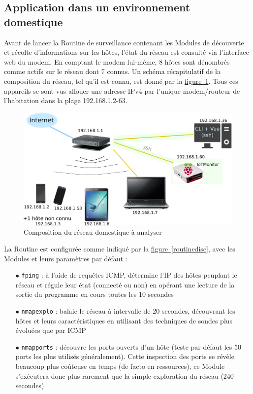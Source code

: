 \documentclass[]{article}
\newcommand{\wordlink}[2]{\hyperref[#1]{#2~\ref{#1}}}
\begin{document}
\newpage

\subsection{Application dans un environnement domestique}

Avant de lancer la Routine de surveillance contenant les Modules de découverte et récolte d'informations sur les hôtes, l'état du réseau est consulté via l'interface web du modem. En comptant le modem lui-même, 8 hôtes sont dénombrés comme actifs sur le réseau dont 7 connus. Un schéma récapitulatif de la composition du réseau, tel qu'il est connu, est donné par la \wordlink{mynetwork}{figure}. Tous ces appareils se sont vus allouer une adresse IPv4 par l'unique modem/routeur de l'habitation dans la plage 192.168.1.2-63.\\

\begin{figure}[!ht]
\centering
     \includegraphics[width=0.75\linewidth]{mynetwork}
     \caption{Composition du réseau domestique à analyser}
     \label{mynetwork}
\end{figure}

\vspace{0.1cm}

\par La Routine est configurée comme indiqué par la \wordlink{routinedisc}{figure}, avec les Modules et leurs paramètres par défaut :\\
\begin{itemize}
\item[$\bullet$] \texttt{fping} : à l'aide de requêtes ICMP, détermine l'IP des hôtes peuplant le réseau et régule leur état (connecté ou non) en opérant une lecture de la sortie du programme en cours toutes les 10 secondes
\vspace{0.1cm}
\item[$\bullet$] \texttt{nmapexplo} : balaie le réseau à intervalle de 20 secondes, découvrant les hôtes et leurs caractéristiques en utilisant des techniques de sondes plus évoluées que par ICMP
\vspace{0.1cm}
\item[$\bullet$] \texttt{nmapports} : découvre les ports ouverts d'un hôte (teste par défaut les 50 ports les plus utilisés généralement). Cette inspection des ports se révèle beaucoup plus coûteuse en temps (de facto en ressources), ce Module s'exécutera donc plus rarement que la simple exploration du réseau (240 secondes)

\end{itemize}
\end{document}
